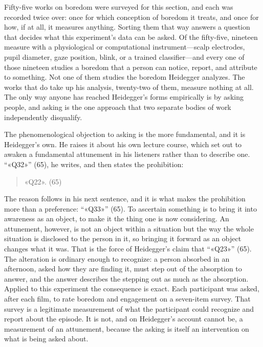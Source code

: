 
Fifty-five works on boredom were surveyed for this section, and each was recorded twice over:
once for which conception of boredom it treats, and once for how, if at all, it measures
anything. Sorting them that way answers a question that decides what this experiment's data can
be asked. Of the fifty-five, nineteen measure with a physiological or computational
instrument---scalp electrodes, pupil diameter, gaze position, blink, or a trained
classifier---and every one of those nineteen studies a boredom that a person can notice, report,
and attribute to something. Not one of them studies the boredom Heidegger analyzes. The works
that do take up his analysis, twenty-two of them, measure nothing at all. The only way anyone
has reached Heidegger's forms empirically is by asking people, and asking is the one approach
that two separate bodies of work independently disqualify.

The phenomenological objection to asking is the more fundamental, and it is Heidegger's own. He
raises it about his own lecture course, which set out to awaken a fundamental attunement in his
listeners rather than to describe one. ``«Q32»'' (65), he writes, and then states the
prohibition:

\begin{quote}
«Q22». (65)
\end{quote}

\noindent The reason follows in his next sentence, and it is what makes the prohibition more
than a preference: ``«Q33»'' (65). To ascertain something is to bring it into awareness as an
object, to make it the thing one is now considering. An attunement, however, is not an object
within a situation but the way the whole situation is disclosed to the person in it, so
bringing it forward as an object changes what it was. That is the force of Heidegger's claim
that ``«Q23»'' (65). The alteration is ordinary enough to recognize: a person absorbed in an
afternoon, asked how they are finding it, must step out of the absorption to answer, and the
answer describes the stepping out as much as the absorption. Applied to this experiment the
consequence is exact. Each participant was asked, after each film, to rate boredom and
engagement on a seven-item survey. That survey is a legitimate measurement of what the
participant could recognize and report about the episode. It is not, and on Heidegger's account
cannot be, a measurement of an attunement, because the asking is itself an
intervention on what is being asked about.

